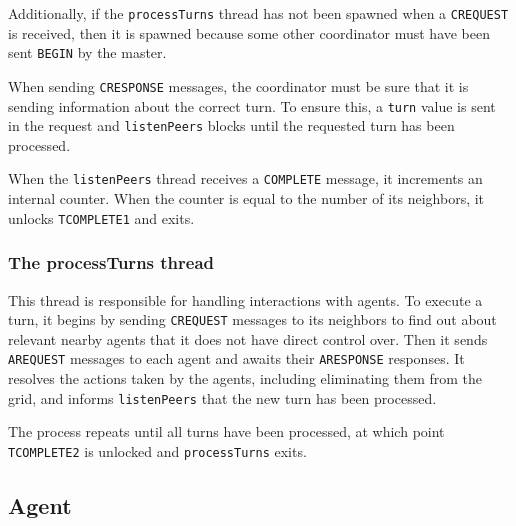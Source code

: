 Additionally, if the \texttt{processTurns} thread has not been spawned when a \texttt{CREQUEST} is received, then it is spawned because some other coordinator must have been sent \texttt{BEGIN} by the master.

When sending \texttt{CRESPONSE} messages, the coordinator must be sure that it is sending information about the correct turn. To ensure this, a \texttt{turn} value is sent in the request and \texttt{listenPeers} blocks until the requested turn has been processed.

When the \texttt{listenPeers} thread receives a \texttt{COMPLETE} message, it increments an internal counter. When the counter is equal to the number of its neighbors, it unlocks \texttt{TCOMPLETE1} and exits.

\subsubsection{The processTurns thread}

This thread is responsible for handling interactions with agents. To execute a turn, it begins by sending \texttt{CREQUEST} messages to its neighbors to find out about relevant nearby agents that it does not have direct control over. Then it sends \texttt{AREQUEST} messages to each agent and awaits their \texttt{ARESPONSE} responses. It resolves the actions taken by the agents, including eliminating them from the grid, and informs \texttt{listenPeers} that the new turn has been processed.

The process repeats until all turns have been processed, at which point \texttt{TCOMPLETE2} is unlocked and \texttt{processTurns} exits.

\subsection{Agent}

